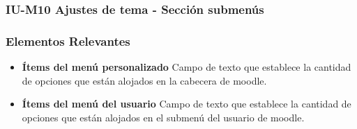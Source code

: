 


\subsubsection{IU-M10 Ajustes de tema - Sección submenús}



\subsubsection{Elementos Relevantes}

    \begin{itemize}
        \item {\bf Ítems del menú personalizado}
            Campo de texto que establece la cantidad de opciones que están alojados en la cabecera de moodle.
        \item {\bf Ítems del menú del usuario}
            Campo de texto que establece la cantidad de opciones que están alojados en el submenú del usuario de moodle.
    \end{itemize}


\clearpage
